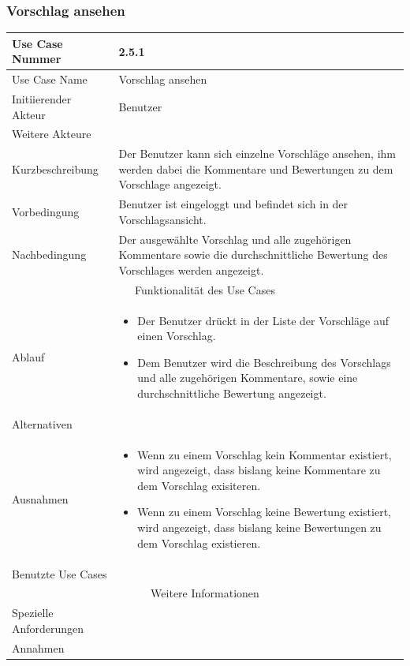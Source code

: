 \documentclass[10pt,a4paper]{article}
\begin{document}
\subsubsection{Vorschlag ansehen}
	\begin{tabularx}{\textwidth}{|l|X|}
	\hline Use Case Nummer & 2.5.1 \\ 
	\hline Use Case Name & Vorschlag ansehen \\ 
	\hline Initiierender Akteur & Benutzer \\
	\hline Weitere Akteure &  \\
	\hline Kurzbeschreibung & Der Benutzer kann sich einzelne Vorschl\"age ansehen, ihm werden dabei die Kommentare und Bewertungen zu dem Vorschlage angezeigt. \\
	\hline Vorbedingung & Benutzer ist eingeloggt und befindet sich in der Vorschlagsansicht. \\
	\hline Nachbedingung & Der ausgewählte Vorschlag und alle zugehörigen Kommentare sowie die durchschnittliche Bewertung des Vorschlages werden angezeigt. \\
	\hline \multicolumn{2}{|c|}{Funktionalität des Use Cases}\\
	\hline Ablauf & \begin{itemize}
		\item Der Benutzer drückt in der Liste der Vorschläge auf einen Vorschlag.
		\item Dem Benutzer wird die Beschreibung des Vorschlags und alle zugehörigen Kommentare, sowie eine durchschnittliche Bewertung angezeigt.
	\end{itemize} \\
	\hline Alternativen &  \\
	\hline Ausnahmen & \begin{itemize}
        	\item Wenn zu einem Vorschlag kein Kommentar existiert, wird angezeigt, dass bislang keine Kommentare zu dem Vorschlag exisiteren.
                \item Wenn zu einem Vorschlag keine Bewertung existiert, wird angezeigt, dass bislang keine Bewertungen zu dem Vorschlag existieren. 
                \end{itemize} \\
	\hline Benutzte Use Cases &  \\
	\hline \multicolumn{2}{|c|}{Weitere Informationen} \\
	\hline Spezielle Anforderungen &  \\
	\hline Annahmen &  \\
	\hline
	\end{tabularx}
\end{document}
